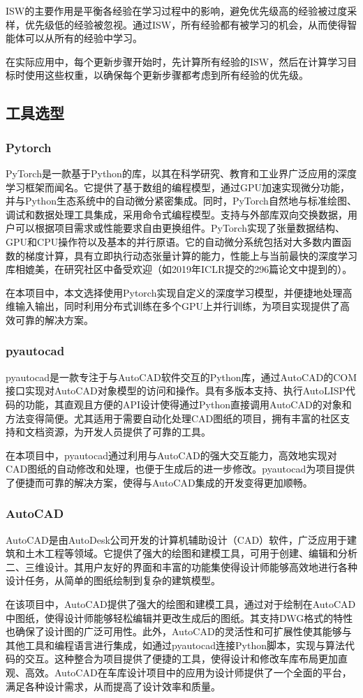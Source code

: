 ISW的主要作用是平衡各经验在学习过程中的影响，避免优先级高的经验被过度采样，优先级低的经验被忽视。通过ISW，所有经验都有被学习的机会，从而使得智能体可以从所有的经验中学习。

在实际应用中，每个更新步骤开始时，先计算所有经验的ISW，然后在计算学习目标时使用这些权重，以确保每个更新步骤都考虑到所有经验的优先级。

\subsection{工具选型}
\subsubsection{Pytorch}
PyTorch是一款基于Python的库，以其在科学研究、教育和工业界广泛应用的深度学习框架而闻名。它提供了基于数组的编程模型，通过GPU加速实现微分功能，并与Python生态系统中的自动微分紧密集成。同时，PyTorch自然地与标准绘图、调试和数据处理工具集成，采用命令式编程模型。支持与外部库双向交换数据，用户可以根据项目需求或性能要求自由更换组件。PyTorch实现了张量数据结构、GPU和CPU操作符以及基本的并行原语。它的自动微分系统包括对大多数内置函数的梯度计算，具有立即执行动态张量计算的能力，性能上与当前最快的深度学习库相媲美，在研究社区中备受欢迎（如2019年ICLR提交的296篇论文中提到的\cite{paszke2019pytorch}）。

在本项目中，本文选择使用Pytorch实现自定义的深度学习模型，并便捷地处理高维输入输出，同时利用分布式训练在多个GPU上并行训练，为项目实现提供了高效可靠的解决方案。
\subsubsection{pyautocad}
pyautocad\cite{shahzad2023implementing}是一款专注于与AutoCAD软件交互的Python库，通过AutoCAD的COM接口实现对AutoCAD对象模型的访问和操作。具有多版本支持、执行AutoLISP代码的功能，其直观且方便的API设计使得通过Python直接调用AutoCAD的对象和方法变得简便。尤其适用于需要自动化处理CAD图纸的项目，拥有丰富的社区支持和文档资源，为开发人员提供了可靠的工具。

在本项目中，pyautocad通过利用与AutoCAD的强大交互能力，高效地实现对CAD图纸的自动修改和处理，也便于生成后的进一步修改。pyautocad为项目提供了便捷而可靠的解决方案，使得与AutoCAD集成的开发变得更加顺畅。
\subsubsection{AutoCAD}
AutoCAD是由AutoDesk公司开发的计算机辅助设计（CAD）软件，广泛应用于建筑和土木工程等领域。它提供了强大的绘图和建模工具，可用于创建、编辑和分析二、三维设计。其用户友好的界面和丰富的功能集使得设计师能够高效地进行各种设计任务，从简单的图纸绘制到复杂的建筑模型。

在该项目中，AutoCAD提供了强大的绘图和建模工具，通过对于绘制在AutoCAD中图纸，使得设计师能够轻松编辑并更改生成后的图纸。其支持DWG格式的特性也确保了设计图的广泛可用性。此外，AutoCAD的灵活性和可扩展性使其能够与其他工具和编程语言进行集成，如通过pyautocad连接Python脚本，实现与算法代码的交互。这种整合为项目提供了便捷的工具，使得设计和修改车库布局更加直观、高效。AutoCAD在车库设计项目中的应用为设计师提供了一个全面的平台，满足各种设计需求，从而提高了设计效率和质量。
